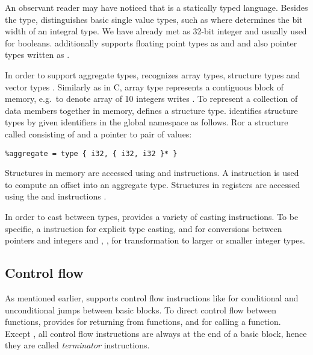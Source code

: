 An observant reader may have noticed that \LLVMIR is a statically typed
language.  Besides the  type, \LLVM distinguishes basic single value
types, such as  where  determines the bit width of an integral
type. We have already met  as 32-bit integer and  usually
used for booleans.  \LLVM additionally supports floating point types as
 and  and also pointer types written as .

In order to support aggregate types, \LLVM recognizes array types, structure types
and vector types \cite{LLVM:langref}. Similarly as in C, array type represents a
contiguous block of memory, e.g.~to denote array of 10 integers
\LLVM writes \code{[10 × i32]}. To represent a collection of data members
together in memory, \LLVM defines a structure type. \LLVM identifies structure types
by given identifiers in the global namespace as follows. Ror a structure called
 consisting of  and a pointer to pair of 
values:

\begin{verbatim}
%aggregate = type { i32, { i32, i32 }* }
\end{verbatim}

Structures in memory are accessed using  and  instructions.
A  instruction is used to compute an offset into an aggregate type.
Structures in registers are accessed using the  and 
instructions \cite{LLVM:langref}.

In order to cast between types, \LLVM provides a variety of casting instructions.
To be specific, a  instruction for explicit type casting,  and
 for conversions between pointers and integers and , ,
 for transformation to larger or smaller integer types.

\subsection{Control flow} \label{subsec:controlflow}

As mentioned earlier, \LLVM supports control flow instructions like  for
conditional and unconditional jumps between basic blocks. To direct control flow
between functions, \LLVM provides  for returning from functions,  and
 for calling a function. Except , all control flow instructions
are always at the end of a basic block, hence they are called \emph{terminator}
instructions.

